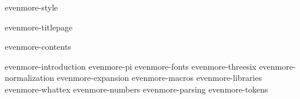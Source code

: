 \environment evenmore-style

\dontcomplain

\startdocument

    \component evenmore-titlepage

    \startfrontmatter
        \component evenmore-contents
    \stopfrontmatter

    \startbodymatter
        \component evenmore-introduction
        \component evenmore-pi
        \component evenmore-fonts
        \component evenmore-threesix
        \component evenmore-normalization
        \component evenmore-expansion
        \component evenmore-macros
        \component evenmore-libraries
        \component evenmore-whattex
        \component evenmore-numbers
         \stopchapter
        \component evenmore-parsing
        \component evenmore-tokens
    \stopbodymatter

\stopdocument
